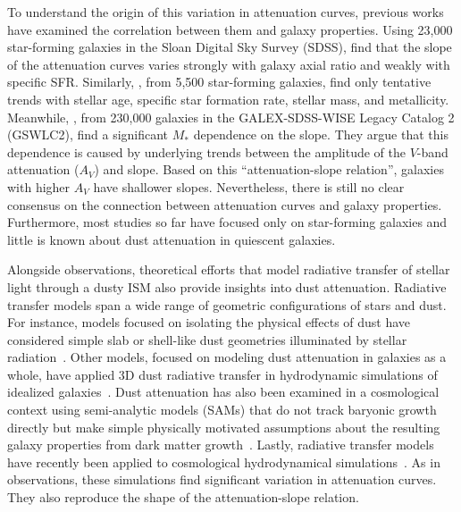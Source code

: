 To understand the origin of this variation in attenuation curves, previous
works have examined the correlation between them and galaxy properties. 
Using 23,000 star-forming galaxies in the Sloan Digital
Sky Survey (SDSS), \cite{wild2011} find that the slope of the attenuation curves varies 
strongly with galaxy axial ratio and weakly with specific SFR. Similarly, 
\cite{battisti2017}, from 5,500 star-forming galaxies, find only tentative
trends with stellar age, specific star formation rate, stellar mass, and
metallicity. Meanwhile, \cite{salim2018}, from 230,000 galaxies in the
GALEX-SDSS-WISE Legacy Catalog 2 (GSWLC2), find a significant $M_*$ 
dependence on the slope. They argue that this dependence is caused by
underlying trends between the amplitude of the $V$-band attenuation ($A_V$) and
slope. Based on this ``attenuation-slope relation'', galaxies with higher $A_V$
have shallower slopes. Nevertheless, there is still no clear consensus on the
connection between attenuation curves and galaxy properties. Furthermore, most
studies so far have focused only on star-forming galaxies and little is known
about dust attenuation in quiescent galaxies.

Alongside observations, theoretical efforts that model radiative transfer of
stellar light through a dusty ISM also provide insights into dust attenuation.
Radiative transfer models span a wide range of geometric configurations of
stars and dust. For instance, models focused on isolating the physical effects
of dust have considered simple slab or shell-like dust geometries illuminated
by stellar radiation~\citep[\eg][]{witt1996, witt2000, seon2016}. Other models,
focused on modeling dust attenuation in galaxies as a whole, have applied 3D
dust radiative transfer in hydrodynamic simulations of idealized
galaxies~\citep[\eg][]{jonsson2006, rocha2008, hayward2015, natale2015,
hou2017}. Dust attenuation has also been examined in a cosmological context
using semi-analytic models (SAMs) that do not track baryonic growth directly 
but make simple physically motivated assumptions about the resulting galaxy
properties from dark matter growth~\citep[\eg][]{granato2000,
fontanot2009, wilkins2012, gonzalez-perez2013}. Lastly, radiative transfer
models have recently been applied to cosmological hydrodynamical
simulations~\cite[\eg]{camps2015, narayanan2018, trayford2020}. As in
observations, these simulations find significant variation in attenuation
curves. They also reproduce the shape of the attenuation-slope relation. 

